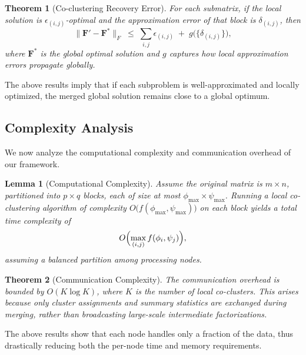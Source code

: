 \documentclass[journal]{IEEEtran}
\newtheorem{theorem}{Theorem}
\newtheorem{lemma}{Lemma}
\begin{document}
\begin{theorem}[Co-clustering Recovery Error]
    \label{thm:recovery_error_appendix}
    For each submatrix, if the local solution is \(\epsilon_{(i,j)}\)-optimal and the approximation error of that block is \(\delta_{(i,j)}\), then
    \begin{equation}
        \|\mathbf{F}' - \mathbf{F}^*\|_F \;\le\; \sum_{i,j}\epsilon_{(i,j)} \;+\; g\bigl(\{\delta_{(i,j)}\}\bigr),
    \end{equation}
    where \(\mathbf{F}^*\) is the global optimal solution and \(g\) captures how local approximation errors propagate globally.
\end{theorem}

The above results imply that if each subproblem is well-approximated and locally optimized, the merged global solution remains close to a global optimum.

\subsection{Complexity Analysis}
\label{subsec:complexity_analysis}

We now analyze the computational complexity and communication overhead of our framework.

\begin{lemma}[Computational Complexity]
    \label{lem:computational_complexity}
    Assume the original matrix is \(m \times n\), partitioned into \(p \times q\) blocks, each of size at most \(\phi_{\max} \times \psi_{\max}\). Running a local co-clustering algorithm of complexity \(O\bigl(f(\phi_{\max}, \psi_{\max})\bigr)\) on each block yields a total time complexity of
    \begin{equation}
        O\Bigl(\max_{(i,j)} f(\phi_i,\psi_j)\Bigr),
    \end{equation}
    assuming a balanced partition among processing nodes.
\end{lemma}

\begin{theorem}[Communication Complexity]
    \label{thm:communication_overhead}
    The communication overhead is bounded by \(O(K \log K)\), where \(K\) is the number of local co-clusters. This arises because only cluster assignments and summary statistics are exchanged during merging, rather than broadcasting large-scale intermediate factorizations.
\end{theorem}

The above results show that each node handles only a fraction of the data, thus drastically reducing both the per-node time and memory requirements.
\end{document}
